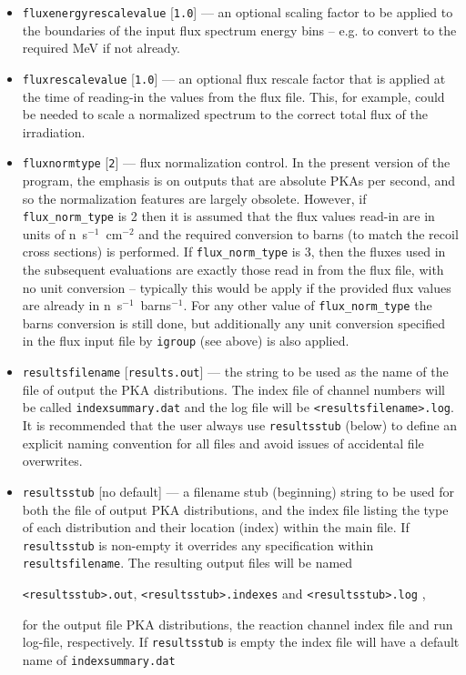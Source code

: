 \documentclass[a4paper]{article}
\begin{document}
\begin{itemize}
\item \texttt{flux{\textunderscore}energy{\textunderscore}rescale{\textunderscore}value} [\texttt{1.0}] --- an optional scaling factor to be applied to the boundaries of the input flux spectrum energy bins -- e.g. to convert to the required MeV if not already.

\item \texttt{flux{\textunderscore}rescale{\textunderscore}value} [\texttt{1.0}] --- an optional flux rescale factor that is applied at the time of reading-in the values from the flux file. This, for example, could be needed to scale a normalized spectrum to the correct total flux of the irradiation. 

\item \texttt{flux{\textunderscore}norm{\textunderscore}type} [\texttt{2}] --- flux normalization control. In the present version of the program, the emphasis is on outputs that are absolute PKAs per second, and so the normalization features are largely obsolete. However, if \verb|flux_norm_type| is 2 then it is assumed that the flux values read-in are in units of n~s\(^{-1}\)~cm\(^{-2}\) and the required conversion to barns (to match the recoil cross sections) is performed. If \verb|flux_norm_type| is 3, then the fluxes used in the subsequent evaluations are exactly those read in from the flux file, with no unit conversion -- typically this would be apply if the provided flux values are already in n~s\(^{-1}\)~barns\(^{-1}\). For any other value of \verb|flux_norm_type| the barns conversion is still done, but additionally any unit conversion specified in the flux input file by \texttt{igroup} (see above) is also applied.
\item \texttt{results{\textunderscore}filename} [\texttt{results.out}] --- the string to be used as the name of the file of output the PKA distributions. The index file of channel numbers will be called \texttt{index{\textunderscore}summary.dat} and the log file will be \texttt{<results{\textunderscore}filename>.log}. It is recommended that the user always use \texttt{results{\textunderscore}stub} (below) to define an explicit naming convention for all files and avoid issues of accidental file overwrites.
\item \texttt{results{\textunderscore}stub} [no default] --- a filename stub (beginning) string to be used for both the file of output PKA distributions, and the index file listing the type of each distribution and their location (index) within the main file. If \texttt{results{\textunderscore}stub} is non-empty it overrides any specification within \texttt{results{\textunderscore}filename}. The resulting output files will be named{\begin{center}\texttt{<results{\textunderscore}stub>.out}, \texttt{<results{\textunderscore}stub>.indexes} and \texttt{<results{\textunderscore}stub>.log} ,\end{center}}for the output file PKA distributions, the reaction channel index file and run log-file, respectively. If \texttt{results{\textunderscore}stub} is empty the index file will have a default name of \texttt{index{\textunderscore}summary.dat}

\end{itemize}
\end{document}
